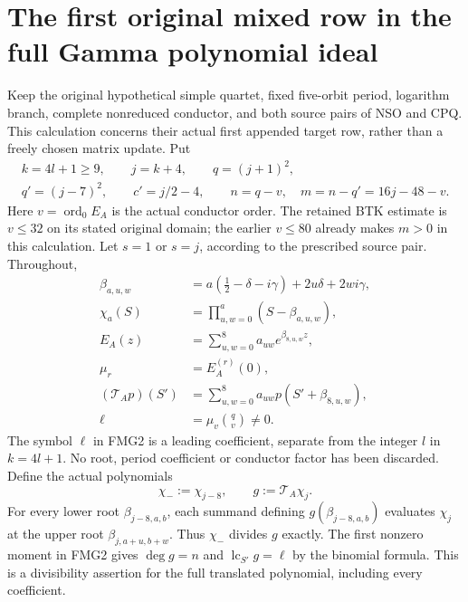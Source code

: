 \documentclass[11pt,a4paper]{article}
\begin{document}
\label{MPBUILD:FIRST_ROW_PROOF:end}
\label{MTBUILD:FRG_COMPLETE_PREREQUISITE:end}

\clearpage
\label{MTBUILD:FMG_COMPLETE_PREREQUISITE:start}
\clearpage
\label{MPBUILD:FIRST_ROW_MIXED_GAMMA:start}
\section{The first original mixed row in the full Gamma polynomial ideal}
\label{sec:FMG}

Keep the original hypothetical simple quartet, fixed five-orbit period,
logarithm branch, complete nonreduced conductor, and both source pairs
of NSO and CPQ. This calculation concerns their actual first appended
target row, rather than a freely chosen matrix update. Put
\[
 \begin{gathered}
 k=4l+1\ge9,\qquad j=k+4,\qquad q=(j+1)^2,\qquad\\
 q'=(j-7)^2,\qquad c'=j/2-4,
 \qquad n=q-v,\quad m=n-q'=16j-48-v .
 \end{gathered}\tag{FMG1}
\]
Here $v=\operatorname{ord}_0 E_A$ is the actual conductor order.
The retained BTK estimate is $v\le32$ on its stated original domain;
the earlier $v\le80$ already makes $m>0$ in this calculation.
Let $s=1$ or $s=j$, according to the prescribed source pair. Throughout,
\[
\begin{aligned}
 \beta_{a,u,w}&=a(\tfrac12-\delta-i\gamma)+2u\delta+2wi\gamma,\\
 \chi_a(S)&=\prod_{u,w=0}^a(S-\beta_{a,u,w}),\\
 E_A(z)&=\sum_{u,w=0}^8a_{uw}e^{\beta_{8,u,w}z},\\
 \mu_r&=E_A^{(r)}(0),\\
 (\mathcal T_Ap)(S')&=\sum_{u,w=0}^8a_{uw}p(S'+\beta_{8,u,w}),\\
 \ell&=\mu_v\binom qv\ne0 .
\end{aligned}                                                     \tag{FMG2}
\]
The symbol $\ell$ in FMG2 is a leading coefficient, separate from the
integer $l$ in $k=4l+1$. No root, period coefficient or conductor
factor has been discarded. Define the actual polynomials
\[
        \chi_-:=\chi_{j-8},\qquad g:=\mathcal T_A\chi_j .
                                                               \tag{FMG3}
\]
For every lower root $\beta_{j-8,a,b}$, each summand defining
$g(\beta_{j-8,a,b})$ evaluates $\chi_j$ at the upper root
$\beta_{j,a+u,b+w}$. Thus $\chi_-$ divides $g$ exactly.
The first nonzero moment in FMG2 gives
$\deg g=n$ and $\operatorname{lc}_{S'}g=\ell$ by the binomial
formula. This is a divisibility assertion for the full translated
polynomial, including every coefficient.
\end{document}
